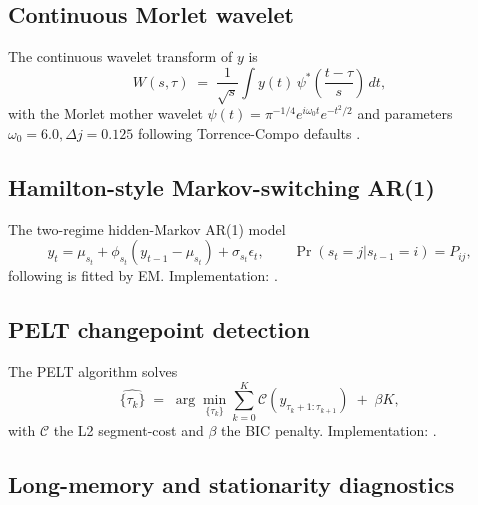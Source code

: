 \subsection{Continuous Morlet wavelet}

The continuous wavelet transform of \(y\) is
\begin{equation}
W(s,\tau) \;=\; \frac{1}{\sqrt{s}}\int y(t)\,\psi^{\ast}\!\left(\frac{t-\tau}{s}\right)\,dt,
\end{equation}
with the Morlet mother wavelet
\(\psi(t)=\pi^{-1/4}e^{i\omega_0 t}e^{-t^2/2}\) and parameters
\(\omega_0=6.0,\Delta j=0.125\) following Torrence-Compo defaults
\citep{torrence_compo1998}.

\subsection{Hamilton-style Markov-switching AR(1)}

The two-regime hidden-Markov AR(1) model
\begin{equation}
y_t = \mu_{s_t} + \phi_{s_t}(y_{t-1} - \mu_{s_t}) + \sigma_{s_t}\epsilon_t,
\qquad
\Pr(s_t=j|s_{t-1}=i)=P_{ij},
\end{equation}
following \citet{hamilton1989} is fitted by EM. Implementation:
.

\subsection{PELT changepoint detection}

The PELT algorithm \citep{killick_fearnhead_eckley2012} solves
\begin{equation}
\hat{\{\tau_k\}} \;=\; \arg\min_{\{\tau_k\}} \sum_{k=0}^{K}
\mathcal{C}(y_{\tau_k+1{:}\tau_{k+1}}) \;+\; \beta K,
\end{equation}
with \(\mathcal{C}\) the L2 segment-cost and \(\beta\) the BIC
penalty. Implementation: .

\subsection{Long-memory and stationarity diagnostics}
\label{sec:longmem_diagnostics}

